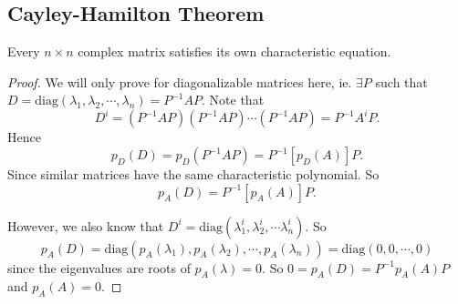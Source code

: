 \documentclass[a4paper]{article}
\begin{document}
      \subsection{Cayley-Hamilton Theorem}
      \begin{thm}
        Every $n\times n$ complex matrix satisfies its own characteristic equation.
      \end{thm}

      \begin{proof}
        We will only prove for diagonalizable matrices here, ie. $\exists P$ such that $D = \mathrm{diag}(\lambda_1, \lambda_2, \cdots, \lambda_n) = P^{-1}AP$.
        Note that
        \[
          D^i = (P^{-1}AP)(P^{-1}AP)\cdots(P^{-1}AP) = P^{-1}A^iP.
        \]
        Hence
        \[
          p_D(D) = p_D(P^{-1}AP) = P^{-1}[p_D(A)]P.
        \]
        Since similar matrices have the same characteristic polynomial. So
        \[
          p_A(D) = P^{-1}[p_A(A)]P.
        \]

        However, we also know that $D^i = \mathrm{diag}(\lambda_1^i, \lambda_2^i, \cdots \lambda_n^i)$. So
        \[
          p_A(D) = \mathrm{diag}(p_A(\lambda_1), p_A(\lambda_2), \cdots, p_A(\lambda_n)) = \mathrm{diag}(0, 0, \cdots, 0)
        \]
        since the eigenvalues are roots of $p_A(\lambda) = 0$. So $0 = p_A(D) = P^{-1}p_A(A)P$ and $p_A(A) = 0$.
      \end{proof}
\end{document}
